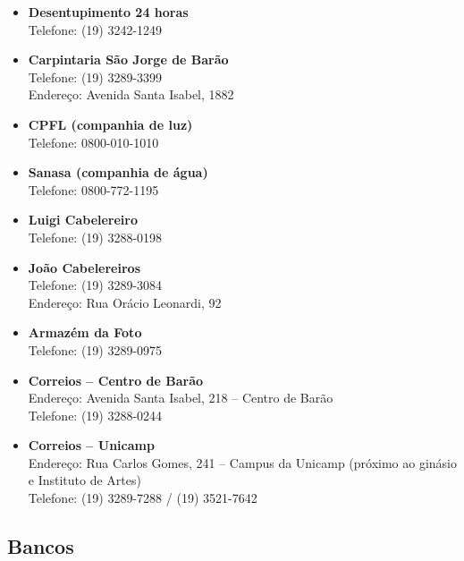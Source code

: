 \begin{itemize}
\item  \textbf{Desentupimento 24 horas}
		\\Telefone: (19) 3242-1249

\item  \textbf{Carpintaria São Jorge de Barão}
		\\Telefone: (19) 3289-3399
		\\Endereço: Avenida Santa Isabel, 1882

\item  \textbf{CPFL (companhia de luz)}
		\\Telefone: 0800-010-1010

\item  \textbf{Sanasa (companhia de água)}
		\\Telefone: 0800-772-1195

\item  \textbf{Luigi Cabelereiro}
		\\Telefone: (19) 3288-0198

\item  \textbf{João Cabelereiros}
		\\Telefone: (19) 3289-3084
		\\Endereço: Rua Orácio Leonardi, 92

\item  \textbf{Armazém da Foto}
		\\Telefone: (19) 3289-0975

\item  \textbf{Correios -- Centro de Barão}
		\\Endereço: Avenida Santa Isabel, 218 -- Centro de Barão
		\\Telefone: (19) 3288-0244

\item  \textbf{Correios -- Unicamp}
		\\Endereço: Rua Carlos Gomes, 241 -- Campus da Unicamp (próximo ao
       ginásio e Instituto de Artes)
		\\Telefone: (19) 3289-7288 / (19) 3521-7642
\end{itemize}

\subsection{Bancos}


